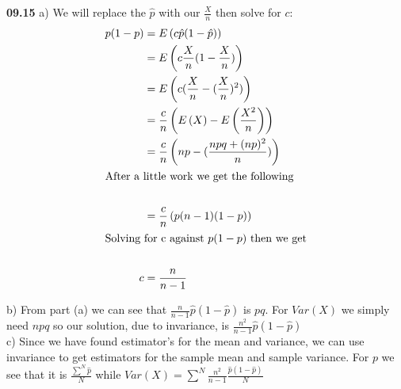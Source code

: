 {\bf 09.15} a) We will replace the $\hat{p}$ with our $\frac{X}{n}$ then solve for $c$: \\
\begin{align*}
	p(1-p) & = E \left( c \hat{p}(1- \hat{p}) \right) \\
	& = E \left( c \frac{X}{n}(1 - \frac{X}{n}) \right) \\
	& = E \left( c ( \frac{X}{n} - (\frac{X}{n})^{2} ) \right) \\
	& = \frac{c}{n} \left( E \left( X \right) - E \left( \frac{X^{2}}{n} \right) \right) \\
	& = \frac{c}{n} \left( np - (\frac{npq + (np)^{2}}{n}) \right) \\
\intertext{After a little work we get the following} \\
	& = \frac{c}{n} \left( p (n-1)(1-p) \right) \\
\intertext{Solving for c against $p(1-p)$ then we get} \\
	c & = \frac{n}{n-1} 
\end{align*}

b) From part (a) we can see that $\frac{n}{n-1}\hat{p}(1-\hat{p})$ is $pq$. For $Var(X)$ we simply need $npq$ so our
solution, due to invariance, is $\frac{n^2}{n-1}\hat{p}(1-\hat{p})$ \\

c) Since we have found estimator's for the mean and variance, we can use invariance to get estimators for the sample
mean and sample variance. For $p$ we see that it is $\frac{\sum^{N} \hat{p}}{N}$ while $Var(X) =
\sum^{N} \frac{n^2}{n-1} \frac{\hat{p}(1 - \hat{p})}{N}$ \\



